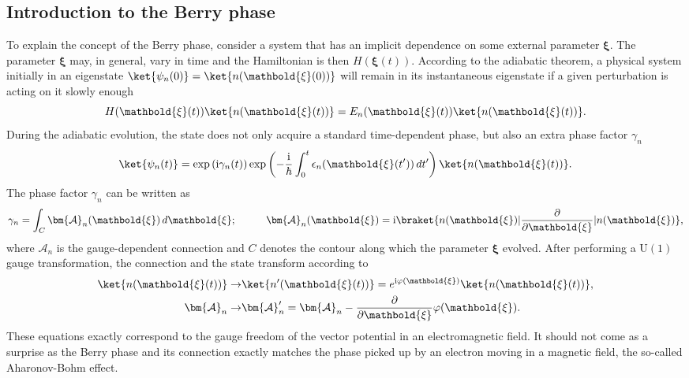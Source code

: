 \subsection{Introduction to the Berry phase}
To explain the concept of the Berry phase, consider a system that has an implicit dependence on some external parameter $\mathbold{\xi}$. The parameter $\mathbold{\xi}$ may, in general, vary in time and the Hamiltonian is then $H(\mathbold{\xi} (t))$. According to the adiabatic theorem, a physical system initially in an eigenstate $\ket{\psi_n (0)} = \ket{ n ( \mathbold{\xi} (0))}$ will remain in its instantaneous eigenstate if a given perturbation is acting on it slowly enough
\begin{equation}
H(\mathbold{\xi} (t))  \ket{ n ( \mathbold{\xi} (t))} = E_n (\mathbold{\xi} (t))  \ket{ n ( \mathbold{\xi} (t))}.
\label{eq:adiabatic_ev}
\end{equation}
During the adiabatic evolution, the state does not only acquire a standard time-dependent phase, but also an extra phase factor $\gamma_n$
\begin{equation}
\ket{\psi_n (t)} = \exp \left( \mathrm{i} \gamma_n (t) \right) \exp \left( - \frac{\mathrm{i}}{\hbar} \int_0^t \epsilon_n (\mathbold{\xi} (t')) \, dt' \right)  \ket{ n ( \mathbold{\xi} (t))}.
\label{eq:phases_adiabatic}
\end{equation}
The phase factor $\gamma_n$ can be written as
\begin{equation}
\gamma_n = \int_C \bm{\mathcal{A}}_n (\mathbold{\xi}) \, d \mathbold{\xi}; \hspace{1cm}  \bm{\mathcal{A}}_n  ( \mathbold{\xi} ) = \mathrm{i} \braket{ n ( \mathbold{\xi} ) | \frac{\partial}{\partial \mathbold{\xi} } | n ( \mathbold{\xi} )}, 
\label{eq:berry_phase1}
\end{equation}
where $\bm{\mathcal{A}}_n$ is the gauge-dependent connection and $C$ denotes the contour along which the parameter $ \mathbold{\xi}$ evolved. After performing a $\mathrm{U}(1)$ gauge transformation, the connection and the state transform according to
\begin{equation}
\begin{aligned}
\ket{ n ( \mathbold{\xi} (t))}  \rightarrow & \ket{ n' ( \mathbold{\xi} (t))} = e^{\mathrm{i} \varphi ( \mathbold{\xi})}  \ket{ n ( \mathbold{\xi} (t))}, \\
 \bm{\mathcal{A}}_n  \rightarrow & \bm{\mathcal{A}}'_n = \bm{ \mathcal{A}}_n  - \frac{\partial}{\partial  \mathbold{\xi}} \varphi (  \mathbold{\xi} ).
\end{aligned}
\label{eq:berry_gaugetransform}
\end{equation}
These equations exactly correspond to the gauge freedom of the vector potential in an electromagnetic field. It should not come as a surprise as the Berry phase and its connection exactly matches the phase picked up by an electron moving in a magnetic field, the so-called Aharonov-Bohm effect. 

